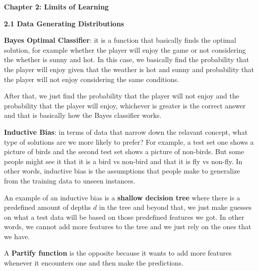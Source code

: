 \documentclass{article}
\begin{document}
\begin{center}
    \Huge \textbf{Chapter 2: Limits of Learning}
    \vspace{0.7cm}
\end{center}

\newpage

\LARGE \textbf{2.1 Data Generating Distributions}

\vspace{0.5cm}

\large \textbf{Bayes Optimal Classifier}: it is a function that basically finds the optimal solution, for example whether the player will enjoy the game or not considering the whether is sunny and hot. In this case, we basically find the probability that the player will enjoy given that the weather is hot and sunny and probability that the player will not enjoy considering the same conditions.

\vspace{0.5cm}

After that, we just find the probability that the player will not enjoy and the probability that the player will enjoy, whichever is greater is the correct answer and that is basically how the Bayes classifier works.

\vspace{0.5cm}

\textbf{Inductive Bias}: in terms of data that narrow down the relavant concept, what type of solutions are we more likely to prefer? For example, a test set one shows a picture of birds and the second test set shows a picture of non-birds. But some people might see it that it is a bird vs non-bird and that it is fly vs non-fly. In other words, inductive bias is the assumptions that people make to generalize from the training data to unseen instances.

\vspace{0.5cm}

An example of an inductive bias is a \textbf{shallow decision tree} where there is a predefined amount of depths $d$ in the tree and beyond that, we just make guesses on what a test data will be based on those predefined features we got. In other words, we cannot add more features to the tree and we just rely on the ones that we have.

\vspace{0.5cm}

A \textbf{Partify function} is the opposite because it wants to add more features whenever it encounters one and then make the predictions.
\end{document}
